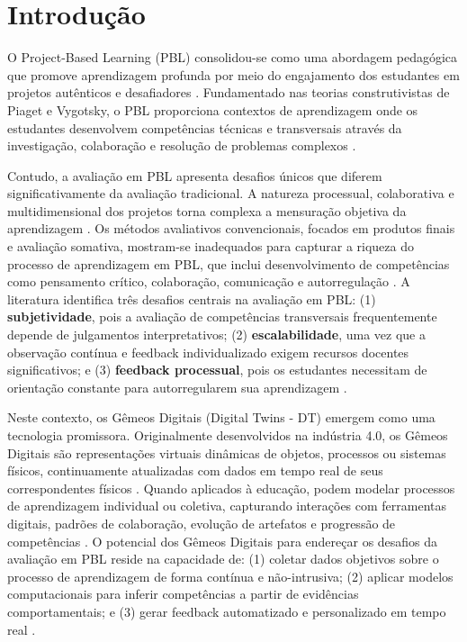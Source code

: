 \documentclass[english, spanish, brazilian]{RBIEarticle} %
\begin{document}

\section{Introdução}

O Project-Based Learning (PBL) consolidou-se como uma abordagem pedagógica que promove aprendizagem profunda por meio do engajamento dos estudantes em projetos autênticos e desafiadores \parencite{Blumenfeld1991}. Fundamentado nas teorias construtivistas de Piaget e Vygotsky, o PBL proporciona contextos de aprendizagem onde os estudantes desenvolvem competências técnicas e transversais através da investigação, colaboração e resolução de problemas complexos \parencite{Kokotsaki2016}.

Contudo, a avaliação em PBL apresenta desafios únicos que diferem significativamente da avaliação tradicional. A natureza processual, colaborativa e multidimensional dos projetos torna complexa a mensuração objetiva da aprendizagem \parencite{Helle2006}. Os métodos avaliativos convencionais, focados em produtos finais e avaliação somativa, mostram-se inadequados para capturar a riqueza do processo de aprendizagem em PBL, que inclui desenvolvimento de competências como pensamento crítico, colaboração, comunicação e autorregulação \parencite{Frank2003}. A literatura identifica três desafios centrais na avaliação em PBL: (1) \textbf{subjetividade}, pois a avaliação de competências transversais frequentemente depende de julgamentos interpretativos; (2) \textbf{escalabilidade}, uma vez que a observação contínua e feedback individualizado exigem recursos docentes significativos; e (3) \textbf{feedback processual}, pois os estudantes necessitam de orientação constante para autorregularem sua aprendizagem \parencite{Savery2015}.

Neste contexto, os Gêmeos Digitais (Digital Twins - DT) emergem como uma tecnologia promissora. Originalmente desenvolvidos na indústria 4.0, os Gêmeos Digitais são representações virtuais dinâmicas de objetos, processos ou sistemas físicos, continuamente atualizadas com dados em tempo real de seus correspondentes físicos \parencite{Grieves2014}. Quando aplicados à educação, podem modelar processos de aprendizagem individual ou coletiva, capturando interações com ferramentas digitais, padrões de colaboração, evolução de artefatos e progressão de competências \parencite{Huang2021}. O potencial dos Gêmeos Digitais para endereçar os desafios da avaliação em PBL reside na capacidade de: (1) coletar dados objetivos sobre o processo de aprendizagem de forma contínua e não-intrusiva; (2) aplicar modelos computacionais para inferir competências a partir de evidências comportamentais; e (3) gerar feedback automatizado e personalizado em tempo real \parencite{Wang2022}.
\end{document}
